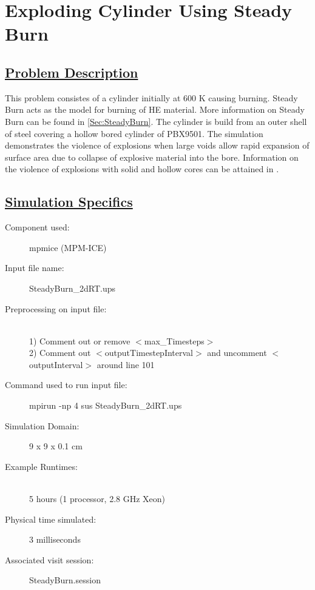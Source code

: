 \newpage


%
\section*{\center Exploding Cylinder Using Steady Burn}
\subsection*{\underline{Problem Description}}
This problem consistes of a cylinder initially at 600 K causing burning.  Steady Burn acts as the model for burning of HE material.  More information on Steady Burn can be found in \ref{Sec:SteadyBurn}.  The cylinder is build from an outer shell of steel covering a hollow bored cylinder of PBX9501.  The simulation demonstrates the violence of explosions when large voids allow rapid expansion of surface area due to collapse of explosive material into the bore.  Information on the violence of explosions with solid and hollow cores can be attained in \cite{ref:wighteddings}.  

\subsection*{\underline{Simulation Specifics}}
\begin{description}
\item [Component used:] \hfill mpmice (MPM-ICE)
\item [Input file name:] \hfill SteadyBurn\_2dRT.ups
\item [Preprocessing on input file:]\hfill \\ 1) Comment out or remove $<$max\_Timesteps$>$ \\ 2) Comment out $<$outputTimestepInterval$>$ and uncomment $<$outputInterval$>$ around line 101 \\
\item [Command used to run input file:]\hfill mpirun -np 4 sus SteadyBurn\_2dRT.ups

\item [Simulation Domain:]\hfill    9 x 9 x 0.1 cm

\item [Example Runtimes:] \hfill \\
 5 hours   (1 processor, 2.8 GHz Xeon)

\item [Physical time simulated:] \hfill 3 milliseconds \\ 


\item [Associated visit session:] \hfill SteadyBurn.session

\end{description}

